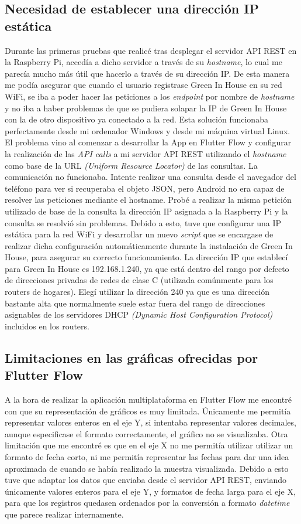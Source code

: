    \subsection{Necesidad de establecer una dirección IP estática}
    Durante las primeras pruebas que realicé tras desplegar el servidor API REST en la Raspberry Pi, accedía a dicho servidor a través de su \textit{hostname}, lo cual me parecía mucho más útil que hacerlo a través de su dirección IP. De esta manera me podía asegurar que cuando el usuario registrase Green In House en su red WiFi, se iba a poder hacer las peticiones a los \textit{endpoint} por nombre de \textit{hostname} y no iba a haber problemas de que se pudiera solapar la IP de Green In House con la de otro dispositivo ya conectado a la red. 
    Esta solución funcionaba perfectamente desde mi ordenador Windows y desde mi máquina virtual Linux. El problema vino al comenzar a desarrollar la App en Flutter Flow y configurar la realización de las \textit{API calls} a mi servidor API REST utilizando el \textit{hostname} como base de la URL \textit{(Uniform Resource Locator)} de las consultas. La comunicación no funcionaba. Intente realizar una consulta desde el navegador del teléfono para ver si recuperaba el objeto JSON, pero Android no era capaz de resolver las peticiones mediante el hostname. Probé a realizar la misma petición utilizado de base de la consulta la dirección IP asignada a la Raspberry Pi y la consulta se resolvió sin problemas. 
    Debido a esto, tuve que configurar una IP estática para la red WiFi y desarrollar un nuevo \textit{script} que se encargase de realizar dicha configuración automáticamente durante la instalación de Green In House, para asegurar su correcto funcionamiento. La dirección IP que establecí para Green In House es 192.168.1.240, ya que está dentro del rango por defecto de direcciones privadas de redes de clase C (utilizada comúnmente para los routers de hogares). Elegí utilizar la dirección 240 ya que es una dirección bastante alta que normalmente suele estar fuera del rango de direcciones asignables de los servidores DHCP \textit{(Dynamic Host Configuration Protocol)} incluidos en los routers.

    \subsection{Limitaciones en las gráficas ofrecidas por Flutter Flow}
    A la hora de realizar la aplicación multiplataforma en Flutter Flow me encontré con que su representación de gráficos es muy limitada. Únicamente me permitía representar valores enteros en el eje Y, si intentaba representar valores decimales, aunque especificase el formato correctamente, el gráfico no se visualizaba. Otra limitación que me encontré es que en el eje X no me permitía utilizar utilizar un formato de fecha corto, ni me permitía representar las fechas para dar una idea aproximada de cuando se había realizado la muestra visualizada. Debido a esto tuve que adaptar los datos que enviaba desde el servidor API REST, enviando únicamente valores enteros para el eje Y, y formatos de fecha larga para el eje X, para que los registros quedasen ordenados por la conversión a formato \textit{datetime} que parece realizar internamente.